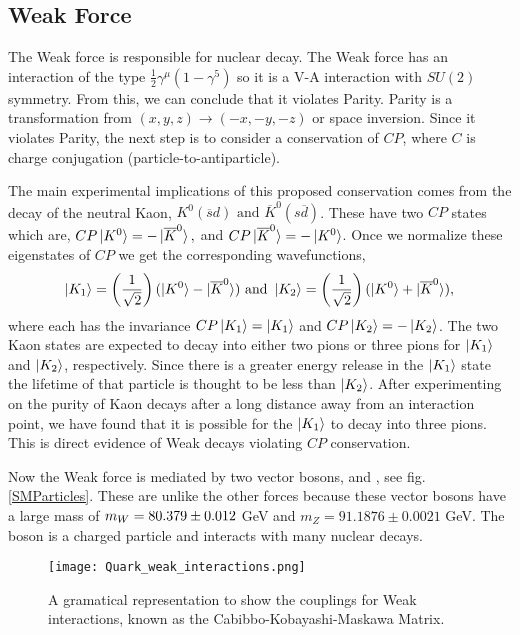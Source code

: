 \subsection{Weak Force}
\label{WeakForce}

The Weak force is responsible for nuclear decay. The Weak force has an interaction of the type $\frac{1}{2}\gamma^\mu(1-\gamma^5)$ so it is a V-A interaction with $SU(2)$ symmetry. From this, we can conclude that it violates Parity. Parity is a transformation from $(x, y, z)\rightarrow(-x,-y,-z)$ or space inversion. Since it violates Parity, the next step is to consider a conservation of $CP$, where $C$ is charge conjugation (particle-to-antiparticle). 

The main experimental implications of this proposed conservation comes from the decay of the neutral Kaon, $K^0(\overline{s}d) \text{ and } \overline{K}^0(s\overline{d})$. These have two $CP$ states which are, $CP\ket{K^0}=-\ket{\overline{K}^0},$ and $CP\ket{\overline{K}^0}=-\ket{K^0}$. Once we normalize these eigenstates of $CP$ we get the corresponding wavefunctions,
\begin{equation}\label{KaonEigenstate}
\ket{K_1}=\left(\frac{1}{\sqrt{2}}\right)(\ket{K^0}-\ket{\overline{K}^0}) \text{ and } \ket{K_2}=\left(\frac{1}{\sqrt{2}}\right)(\ket{K^0}+\ket{\overline{K}^0}),
\end{equation}
where each has the invariance $CP\ket{K_1}=\ket{K_1}$ and $CP\ket{K_2}=-\ket{K_2}$. The two Kaon states are expected to decay into either two pions or three pions for $\ket{K_1}$ and $\ket{K_2}$, respectively. Since there is a greater energy release in the $\ket{K_1}$ state the lifetime of that particle is thought to be less than $\ket{K_2}$. After experimenting on the purity of Kaon decays after a long distance away from an interaction point, we have found that it is possible for the $\ket{K_1}$ to decay into three pions. This is direct evidence of Weak decays violating $CP$ conservation. 

Now the Weak force is mediated by two vector bosons, \W{} and \Z, see fig. \ref{SMParticles}. These are unlike the other forces because these vector bosons have a large mass of $m_{W}=80.379\pm0.012$ GeV and $m_Z=91.1876\pm0.0021$ GeV. The \W{} boson is a charged particle and interacts with many nuclear decays. 

\begin{figure}
 	\centering
	\texttt{[image: Quark\_weak\_interactions.png]}
 	\caption[CKM Matrix Couplings]{A gramatical representation to show the couplings for Weak interactions, known as the Cabibbo-Kobayashi-Maskawa Matrix. }
 	\label{CKMInteractions} 
\end{figure}

